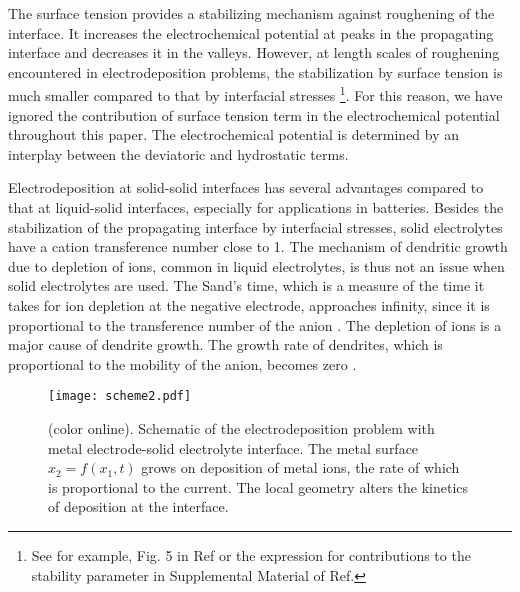 \documentclass[%
reprint,
 amsmath,amssymb,
 aps,
 prb,
]{revtex4-1}
\begin{document}
The surface tension provides a stabilizing mechanism against roughening of the interface. It increases the electrochemical potential at peaks in the propagating interface and decreases it in the valleys. However, at length scales of roughening encountered in electrodeposition problems, the stabilization by surface tension is much smaller compared to that by interfacial stresses \footnote{See for example, Fig. 5 in Ref  or the expression for contributions to the stability parameter in Supplemental Material of Ref. }. For this reason, we have ignored the contribution of surface tension term in the electrochemical potential throughout this paper. The electrochemical potential is determined by an interplay between the deviatoric and hydrostatic terms.

Electrodeposition at solid-solid interfaces has several advantages compared to that at liquid-solid interfaces, especially for applications in batteries. Besides the stabilization of the propagating interface by interfacial stresses, solid electrolytes have a cation transference number close to 1. The mechanism of dendritic growth due to depletion of ions, common in liquid electrolytes, is thus not an issue when solid electrolytes are used.
The Sand's time, which is a measure of the time it takes for ion depletion at the negative electrode, approaches infinity, since it is proportional to the transference number of the anion \cite{monroe2003-dendrite}. The depletion of ions is a major cause of dendrite growth. The growth rate of dendrites, which is proportional to the mobility of the anion, becomes zero \cite{Chazalviel90}. 

\begin{figure}[htbp]
{\texttt{[image: scheme2.pdf]}}
\caption{\label{fig:schematic} (color online). Schematic of the electrodeposition problem with metal electrode-solid electrolyte interface. The metal surface $x_2=f(x_1,t)$ grows on deposition of metal ions, the rate of which is proportional to the current. The local geometry alters the kinetics of deposition at the interface.}
\end{figure}
\end{document}
